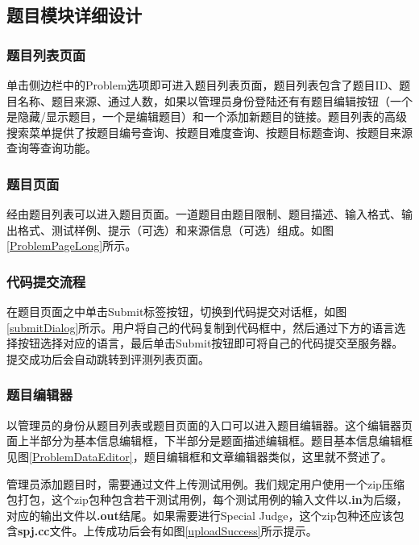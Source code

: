 \subsection{题目模块详细设计}
\subsubsection{题目列表页面}
单击侧边栏中的Problem选项即可进入题目列表页面，题目列表包含了题目ID、题目名称、题目来源、通过人数，如果以管理员身份登陆还有有题目编辑按钮（一个是隐藏/显示题目，一个是编辑题目）和一个添加新题目的链接。题目列表的高级搜索菜单提供了按题目编号查询、按题目难度查询、按题目标题查询、按题目来源查询等查询功能。


\subsubsection{题目页面}
经由题目列表可以进入题目页面。一道题目由题目限制、题目描述、输入格式、输出格式、测试样例、提示（可选）和来源信息（可选）组成。如图\ref{ProblemPageLong}所示。


\subsubsection{代码提交流程}
在题目页面之中单击Submit标签按钮，切换到代码提交对话框，如图\ref{submitDialog}所示。用户将自己的代码复制到代码框中，然后通过下方的语言选择按钮选择对应的语言，最后单击Submit按钮即可将自己的代码提交至服务器。提交成功后会自动跳转到评测列表页面。


\subsubsection{题目编辑器}
以管理员的身份从题目列表或题目页面的入口可以进入题目编辑器。这个编辑器页面上半部分为基本信息编辑框，下半部分是题面描述编辑框。题目基本信息编辑框见图\ref{ProblemDataEditor}，题目编辑框和文章编辑器类似，这里就不赘述了。


管理员添加题目时，需要通过文件上传测试用例。我们规定用户使用一个zip压缩包打包，这个zip包种包含若干测试用例，每个测试用例的输入文件以\textbf{.in}为后缀，对应的输出文件以\textbf{.out}结尾。如果需要进行Special Judge，这个zip包种还应该包含\textbf{spj.cc}文件。上传成功后会有如图\ref{uploadSuccess}所示提示。

